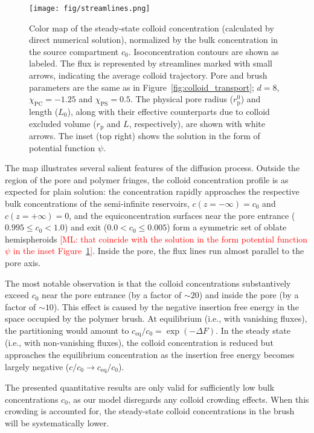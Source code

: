 \documentclass[12pt, a4paper]{article}
\newcommand\todo[1]{\textcolor{red}{#1}}
\begin{document}
\begin{figure}
    \centering
    \centerline{\texttt{[image: fig/streamlines.png]}}
    \caption{
    Color map of the steady-state colloid concentration (calculated by direct numerical solution), normalized by the bulk concentration in the source compartment $c_0$.
    Isoconcentration contours are shown as labeled.
    The flux is represented by streamlines marked with small arrows, indicating the average colloid trajectory.
    Pore and brush parameters are the same as in Figure~\ref{fig:colloid_transport}; $d = 8$, $\chi_{\text{PC}} = -1.25$ and $\chi_{\text{PS}} = 0.5$.
    The physical pore radius ($r_\text{p}^0$) and length ($L_0$), along with their effective counterparts due to colloid excluded volume ($r_\text{p}$ and $L$, respectively), are shown with white arrows.
    The inset (top right) shows the solution in the form of potential function $\psi$.
    }
    \label{fig:colloid_concentration}
\end{figure}

The map illustrates several salient features of the diffusion process.
Outside the region of the pore and polymer fringes, the colloid concentration profile is as expected for plain solution: the concentration rapidly approaches the respective bulk concentrations of the semi-infinite reservoirs, $c(z = -\infty) = c_0$ and $c(z = +\infty) = 0$, and the equiconcentration surfaces near the pore entrance ($0.995 \le c_0 < 1.0$) and exit ($0.0 < c_0 \le 0.005$) form a symmetric set of oblate hemispheroids
\todo{[ML: that coincide with the solution in the form potential function $\psi$ in the inset Figure~\ref{fig:colloid_concentration}]}.
Inside the pore, the flux lines run almost parallel to the pore axis.

The most notable observation is that the colloid concentrations substantively exceed $c_0$ near the pore entrance (by a factor of $\sim20$) and inside the pore (by a factor  of $\sim10$).
This effect is caused by the negative insertion free energy in the space occupied by the polymer brush.
At equilibrium (i.e., with vanishing fluxes), the partitioning would amount to $c_{\text{eq}}/c_0 = \exp\left( -\Delta F \right)$.
In the steady state (i.e., with non-vanishing fluxes), the colloid concentration is reduced but approaches the equilibrium concentration as the insertion free energy becomes largely negative ($c/c_0 \to c_{\text{eq}}/c_0$).

The presented quantitative results are only valid for sufficiently low bulk concentrations $c_0$, as our model disregards any colloid crowding effects.
When this crowding is accounted for, the steady-state colloid concentrations in the brush will be systematically lower.
\end{document}
